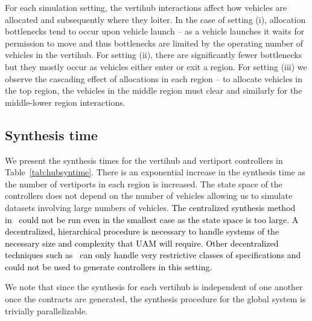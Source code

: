 For each simulation setting, the vertihub interactions affect how vehicles are allocated and subsequently where they loiter.
In the case of setting (i), allocation bottlenecks tend to occur upon vehicle launch -- as a vehicle launches it waits for permission to move and thus bottlenecks are limited by the operating number of vehicles in the vertihub.
For setting (ii), there are significantly fewer bottlenecks but they mostly occur as vehicles either enter or exit a region.
For setting (iii) we observe the cascading effect of allocations in each region -- to allocate vehicles in the top region, the vehicles in the middle region must clear and similarly for the middle-lower region interactions.

\subsection{Synthesis time}

We present the synthesis times for the vertihub and vertiport controllers in Table~\ref{tab:hubsyntime}. 
There is an exponential increase in the synthesis time as the number of vertiports in each region is increased.
The state space of the controllers does not depend on the number of vehicles allowing us to simulate datasets involving large numbers of vehicles. \textcolor{black}{
The centralized synthesis method in~\cite{multiagentshield} could not be run even in the smallest case as the state space is too large. A decentralized, hierarchical procedure is necessary to handle systems of the necessary size and complexity that UAM will require. Other decentralized techniques such as~\cite{bhnfm} can only handle very restrictive classes of specifications and could not be used to generate controllers in this setting.}

We note that since the synthesis for each vertihub is independent of one another once the contracts are generated, the synthesis procedure for the global system is trivially parallelizable. 

